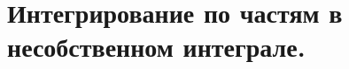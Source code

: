 \documentclass[../main.tex]{subfiles}
\begin{document}
\newpage
\section{Интегрирование по частям в несобственном интеграле.}
\end{document}
